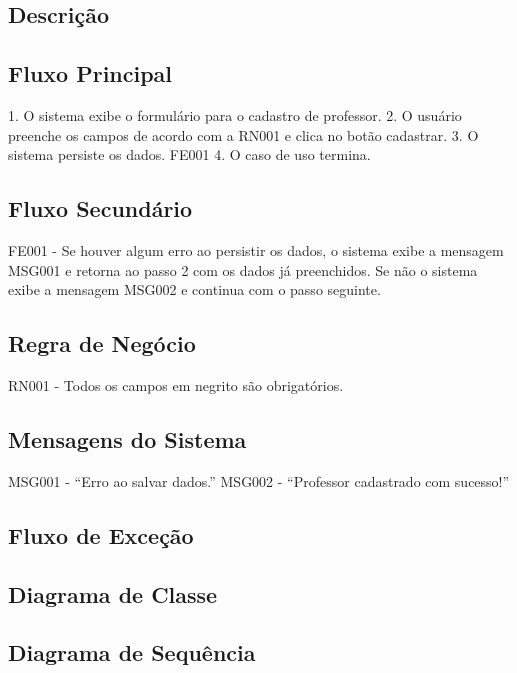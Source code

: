 \subsection{Descrição}

\subsection{Fluxo Principal}
1.  O sistema exibe o formulário para o cadastro de professor.
2.        O usuário preenche os campos de acordo com a RN001 e clica no botão cadastrar.
3.        O sistema persiste os dados. FE001
4.        O caso de uso termina.

\subsection{Fluxo Secundário}
FE001 - Se houver algum erro ao persistir os dados, o sistema exibe a mensagem  MSG001 e retorna ao passo 2 com os dados já preenchidos. Se não o sistema exibe a mensagem MSG002 e continua com o passo seguinte.

\subsection{Regra de Negócio}
    RN001 - Todos os campos em negrito são obrigatórios.

\subsection{Mensagens do Sistema}
    MSG001 - “Erro ao salvar dados.”
    MSG002 - “Professor cadastrado com sucesso!”

\subsection{Fluxo de Exceção}

\subsection{Diagrama de Classe}

\subsection{Diagrama de Sequência}